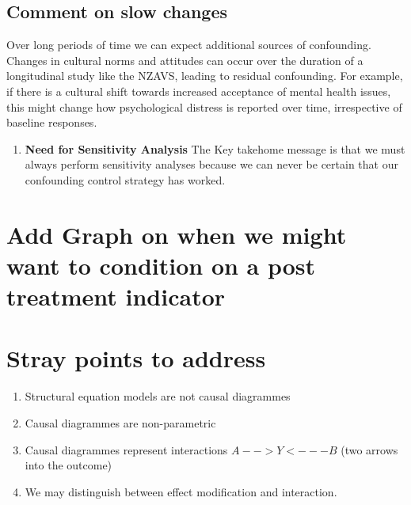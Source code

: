 \documentclass[
  singlecolumn]{report}
\providecommand{\tightlist}{%
  \setlength{\itemsep}{0pt}\setlength{\parskip}{0pt}}\usepackage{longtable,booktabs,array}
\begin{document}
\hypertarget{comment-on-slow-changes}{%
\subsection{Comment on slow changes}\label{comment-on-slow-changes}}

Over long periods of time we can expect additional sources of
confounding. Changes in cultural norms and attitudes can occur over the
duration of a longitudinal study like the NZAVS, leading to residual
confounding. For example, if there is a cultural shift towards increased
acceptance of mental health issues, this might change how psychological
distress is reported over time, irrespective of baseline responses.

\begin{enumerate}
\def\labelenumi{\arabic{enumi}.}
\setcounter{enumi}{9}
\tightlist
\item
  \textbf{Need for Sensitivity Analysis} The Key takehome message is
  that we must always perform sensitivity analyses because we can never
  be certain that our confounding control strategy has worked.
\end{enumerate}

\hypertarget{add-graph-on-when-we-might-want-to-condition-on-a-post-treatment-indicator}{%
\section{Add Graph on when we might want to condition on a post
treatment
indicator}\label{add-graph-on-when-we-might-want-to-condition-on-a-post-treatment-indicator}}

\hypertarget{stray-points-to-address}{%
\section{Stray points to address}\label{stray-points-to-address}}

\begin{enumerate}
\def\labelenumi{\arabic{enumi}.}
\tightlist
\item
  Structural equation models are not causal diagrammes
\item
  Causal diagrammes are non-parametric
\item
  Causal diagrammes represent interactions \(A -- > Y <--- B\) (two
  arrows into the outcome)
\item
  We may distinguish between effect modification and interaction.
\end{enumerate}
\end{document}
